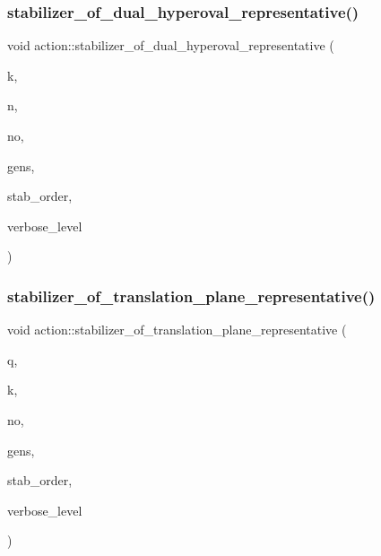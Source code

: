 \subsubsection{\texorpdfstring{stabilizer\+\_\+of\+\_\+dual\+\_\+hyperoval\+\_\+representative()}{stabilizer\_of\_dual\_hyperoval\_representative()}}
{\footnotesize\ttfamily void action\+::stabilizer\+\_\+of\+\_\+dual\+\_\+hyperoval\+\_\+representative (\begin{DoxyParamCaption}\item[{\mbox{\hyperlink{galois_8h_a09fddde158a3a20bd2dcadb609de11dc}{I\+NT}}}]{k,  }\item[{\mbox{\hyperlink{galois_8h_a09fddde158a3a20bd2dcadb609de11dc}{I\+NT}}}]{n,  }\item[{\mbox{\hyperlink{galois_8h_a09fddde158a3a20bd2dcadb609de11dc}{I\+NT}}}]{no,  }\item[{\mbox{\hyperlink{classvector__ge}{vector\+\_\+ge}} $\ast$\&}]{gens,  }\item[{const \mbox{\hyperlink{galois_8h_ab6cc7b4aeb6ea31aba2b3fbfc83ff5e6}{B\+Y\+TE}} $\ast$\&}]{stab\+\_\+order,  }\item[{\mbox{\hyperlink{galois_8h_a09fddde158a3a20bd2dcadb609de11dc}{I\+NT}}}]{verbose\+\_\+level }\end{DoxyParamCaption})}

\mbox{\label{classaction_abf9ef5e235a67966edfdb8e1d76cb88f}} 
\subsubsection{\texorpdfstring{stabilizer\+\_\+of\+\_\+translation\+\_\+plane\+\_\+representative()}{stabilizer\_of\_translation\_plane\_representative()}}
{\footnotesize\ttfamily void action\+::stabilizer\+\_\+of\+\_\+translation\+\_\+plane\+\_\+representative (\begin{DoxyParamCaption}\item[{\mbox{\hyperlink{galois_8h_a09fddde158a3a20bd2dcadb609de11dc}{I\+NT}}}]{q,  }\item[{\mbox{\hyperlink{galois_8h_a09fddde158a3a20bd2dcadb609de11dc}{I\+NT}}}]{k,  }\item[{\mbox{\hyperlink{galois_8h_a09fddde158a3a20bd2dcadb609de11dc}{I\+NT}}}]{no,  }\item[{\mbox{\hyperlink{classvector__ge}{vector\+\_\+ge}} $\ast$\&}]{gens,  }\item[{const \mbox{\hyperlink{galois_8h_ab6cc7b4aeb6ea31aba2b3fbfc83ff5e6}{B\+Y\+TE}} $\ast$\&}]{stab\+\_\+order,  }\item[{\mbox{\hyperlink{galois_8h_a09fddde158a3a20bd2dcadb609de11dc}{I\+NT}}}]{verbose\+\_\+level }\end{DoxyParamCaption})}

